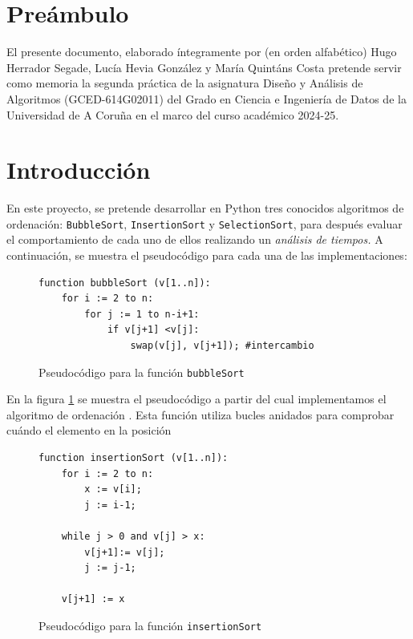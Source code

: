 \documentclass[a4paper, titlepage]{article}
\begin{document}
\newpage

\tableofcontents

\newpage

\section*{Preámbulo}

El presente documento, elaborado íntegramente por (en orden alfabético) Hugo Herrador Segade, Lucía Hevia González y María Quintáns Costa pretende servir como memoria la segunda práctica de la asignatura Diseño y Análisis de Algoritmos (GCED-614G02011) del Grado en Ciencia e Ingeniería de Datos de la Universidad de A Coruña en el marco del curso académico 2024-25.

\section{Introducción}
En este proyecto, se pretende desarrollar en Python tres conocidos algoritmos de ordenación: \texttt{BubbleSort}, \texttt{InsertionSort} y \texttt{SelectionSort}, para después evaluar el comportamiento de cada uno de ellos realizando un \emph{análisis de tiempos.} A continuación, se muestra el pseudocódigo para cada una de las implementaciones:


\begin{figure}[H]
\begin{verbatim}
function bubbleSort (v[1..n]):
	for i := 2 to n:
		for j := 1 to n-i+1:
			if v[j+1] <v[j]:
				swap(v[j], v[j+1]); #intercambio
\end{verbatim}
\label{pseudo_bubble}
\caption{Pseudocódigo para la función \texttt{bubbleSort}}
\end{figure}

En la figura \ref{pseudo_bubble} se muestra el pseudocódigo a partir del cual implementamos el algoritmo de ordenación . Esta función utiliza bucles anidados para comprobar cuándo el elemento en la posición 

\begin{figure}[H]
\begin{verbatim}
function insertionSort (v[1..n]):
	for i := 2 to n:
		x := v[i];
		j := i-1;
	
	while j > 0 and v[j] > x:
		v[j+1]:= v[j];
		j := j-1;

	v[j+1] := x
\end{verbatim}
\label{pseudo_insertion}
\caption{Pseudocódigo para la función \texttt{insertionSort}}
\end{figure}
\end{document}
